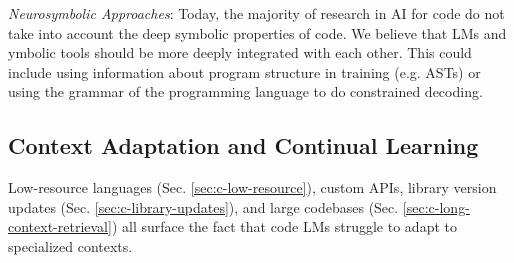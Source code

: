 \textit{Neurosymbolic Approaches}: Today, the majority of research in AI for code do not take into account the deep symbolic properties of code. We believe that LMs and ymbolic tools should be more deeply integrated with each other. This could include using information about program structure in training (e.g. ASTs) or using the grammar of the programming language to do constrained decoding.

\vspace{-0.25cm}

\subsection{Context Adaptation and Continual Learning}

\vspace{-0.1cm}

Low-resource languages (Sec. \ref{sec:c-low-resource}), custom APIs, library version updates (Sec. \ref{sec:c-library-updates}), and large codebases (Sec. \ref{sec:c-long-context-retrieval}) all surface the fact that code LMs struggle to adapt to specialized contexts. 



